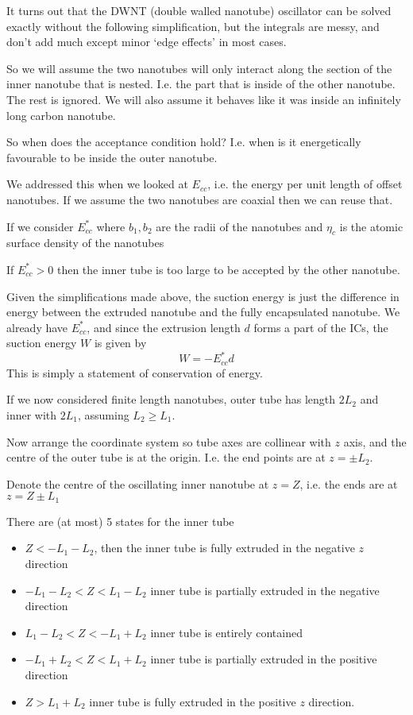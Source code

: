 \documentclass{E:/Documents/Latex/myassignment}
\begin{document}
It turns out that the DWNT (double walled nanotube) oscillator can be solved exactly without the following simplification, but the integrals are messy, and don't add much except minor `edge effects' in most cases.

So we will assume the two nanotubes will only interact along the section of the inner nanotube that is nested. I.e. the part that is inside of the other nanotube. The rest is ignored. We will also assume it behaves like it was inside an infinitely long carbon nanotube.


So when does the acceptance condition hold? I.e. when is it energetically favourable to be inside the outer nanotube.

We addressed this when we looked at $E_{cc}$, i.e. the energy per unit length of offset nanotubes. If we assume the two nanotubes are coaxial then we can reuse that.

If we consider $E_{cc}^*$ where $b_1,b_2$ are the radii of the nanotubes and $\eta_c$ is the atomic surface density of the nanotubes

If $E_{cc}^* > 0$ then the inner tube is too large to be accepted by the other nanotube.

Given the simplifications made above, the suction energy is just the difference in energy between the extruded nanotube and the fully encapsulated nanotube. We already have $E_{cc}^*$, and since the extrusion length $d$ forms a part of the ICs, the suction energy $W$ is given by
\[W = -E_{cc}^* d\]
This is simply a statement of conservation of energy. 

If we now considered finite length nanotubes, outer tube has length $2L_2$ and inner with $2L_1$, assuming $L_2 \geq L_1$.

Now arrange the coordinate system so tube axes are collinear with $z$ axis, and the centre of the outer tube is at the origin. I.e. the end points are at $z = \pm L_2$.

Denote the centre of the oscillating inner nanotube at $z = Z$, i.e. the ends are at $z = Z\pm L_1$

There are (at most) 5 states for the inner tube
\begin{itemize}
	\item $Z < -L_1 - L_2$, then the inner tube is fully extruded in the negative $z$ direction
	\item $-L_1 - L_2 < Z < L_1 - L_2$ inner tube is partially extruded in the negative direction
	\item $L_1 - L_2 < Z < -L_1 +L_2$ inner tube is entirely contained
	\item $-L_1 + L_2 < Z < L_1 + L_2$ inner tube is partially extruded in the positive direction
	\item $Z > L_1 + L_2$ inner tube is fully extruded in the positive $z$ direction.
\end{itemize}
\end{document}
